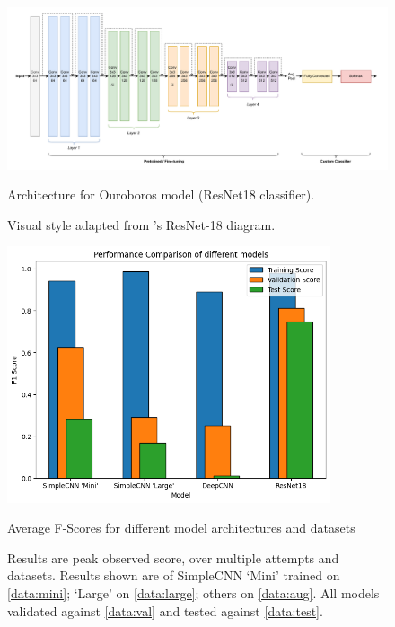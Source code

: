                 \begin{figure}[htbp]
                    \centering
                    \includegraphics[width=\linewidth]{images/Ouroboros.pdf}
                    \caption{Architecture for Ouroboros model (ResNet18 classifier).}
                    \caption*{Visual style adapted from \cite{resnet}'s ResNet-18 diagram.}
                    \label{fig:OuroborosCNN}
                \end{figure}
    
                \begin{figure}[h]
                    \centering
                    \includegraphics[width=0.85\textwidth]{images/ModelComparison.png}
                    \caption{Average F-Scores for different model architectures and datasets}
                    \label{fig:CNNSize_Time}
                    \caption*{Results are peak observed score, over multiple attempts and datasets. Results shown are of SimpleCNN `Mini' trained on \ref{data:mini}; `Large' on \ref{data:large}; others on \ref{data:aug}. All models validated against \ref{data:val} and tested against \ref{data:test}.}
                \end{figure}
    
